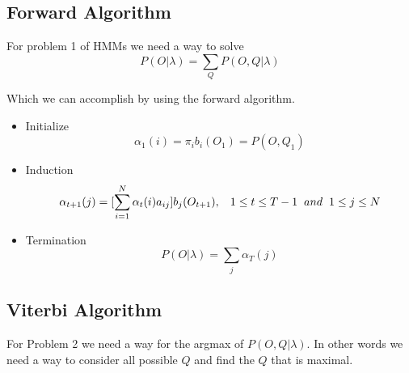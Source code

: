 \documentclass[12pt]{report}
\begin{document}
\subsection{Forward Algorithm}

For problem 1 of HMMs we need a way to solve
\[P(O|\lambda) = \sum_Q P(O, Q|\lambda)\]

\vspace {5 mm}

Which we can accomplish by using the forward algorithm. 
\begin{itemize}
	\item Initialize
	\begin{equation}
	\alpha_1(i) = \pi_ib_i(O_1) = P (O, Q_1)
	\end{equation} 
	\item Induction
	\begin{equation}
	\alpha_{t+1}(j) = [\sum_{i=1}^N \alpha_t(i)a_{ij}]b_j(O_{t+1}), \hspace{3 mm} 1 \leq t \leq T-1 \hspace{2 mm} and \hspace{2 mm} 1 \leq j \leq N
	\end{equation}
	\item Termination
	\begin{equation}
	P(O|\lambda) = \sum_j\alpha_T(j)	
	\end{equation}
\end{itemize}

\subsection{Viterbi Algorithm}

For Problem 2 we need a way for the argmax of $P(O,Q|\lambda)$. In other words we need a way to consider all possible $Q$ and find the $Q$ that is maximal.

\newcommand{\latice}[2][]{
	\begin{tikzpicture}[#2]
	\centering
	\tikzstyle{main}=[circle, minimum size = 6mm, node distance = 5mm]
	\tikzstyle{connect}=[-latex, thin]
	\node[main, fill = black!100] (1) [label=left:$1$] { };
	\node[main, fill = black!100] (2) [below=of 1,label=left:$2$] { };
	\node[main, fill = black!100] (3) [below=of 2,label=left:$3$, label=below:$t_1$] { };
	\node[main, fill = black!100] (4) [right=of 1] { };
	\node[main, fill = black!100] (5) [below=of 4] { };
	\node[main, fill = black!100] (6) [below=of 5, label=below:$t_2$] { };
	\node[main, fill = black!100] (7) [right=of 4] { };
	\node[main, fill = black!100] (8) [below=of 7] { };
	\node[main, fill = black!100] (9) [below=of 8, label=below:$t_3$] { };
	\path (1) edge [connect] (6);
	\path (2) edge [connect] (6);
	\path (3) edge [connect] (6);
	\path (4) edge [connect] (7);
	\path (4) edge [connect] (9);
	\path (4) edge [connect] (9);
	\path (5) edge [connect] (7);
	\path (5) edge [connect] (8);
	\path (5) edge [connect] (9);
	\path (6) edge [connect] (7);
	\path (6) edge [connect] (8);
	\path (6) edge [connect] (9);
\end{tikzpicture}}
\end{document}

